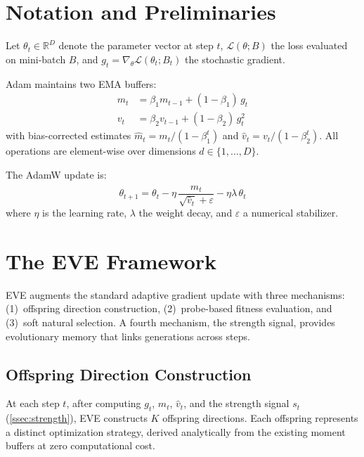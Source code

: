 \documentclass[12pt]{article}
\newcommand{\R}{\mathbb{R}}
\newcommand{\Loss}{\mathcal{L}}
\begin{document}
\section{Notation and Preliminaries}
\label{sec:notation}

Let $\theta_t \in \R^D$ denote the parameter vector at step $t$,
$\Loss(\theta; B)$ the loss evaluated on mini-batch $B$, and
$g_t = \nabla_\theta \Loss(\theta_t; B_t)$ the stochastic gradient.

Adam maintains two EMA buffers:
\begin{align}
  m_t &= \beta_1 m_{t-1} + (1 - \beta_1)\, g_t
  \label{eq:adam_m} \\
  v_t &= \beta_2 v_{t-1} + (1 - \beta_2)\, g_t^2
  \label{eq:adam_v}
\end{align}
with bias-corrected estimates
$\hat{m}_t = m_t / (1 - \beta_1^t)$ and
$\hat{v}_t = v_t / (1 - \beta_2^t)$.
All operations are element-wise over dimensions $d \in \{1, \ldots, D\}$.

The AdamW update is:
\begin{equation}
  \theta_{t+1} = \theta_t
    - \eta\,\frac{\hat{m}_t}{\sqrt{\hat{v}_t} + \varepsilon}
    - \eta\lambda\,\theta_t
  \label{eq:adamw}
\end{equation}
where $\eta$ is the learning rate, $\lambda$ the weight decay, and
$\varepsilon$ a numerical stabilizer.


\section{The EVE Framework}
\label{sec:method}

EVE augments the standard adaptive gradient update with three mechanisms:
(1)~offspring direction construction, (2)~probe-based fitness evaluation,
and (3)~soft natural selection.
A fourth mechanism, the strength signal, provides evolutionary memory
that links generations across steps.

\subsection{Offspring Direction Construction}
\label{ssec:offspring}

At each step $t$, after computing $g_t$, $\hat{m}_t$, $\hat{v}_t$, and
the strength signal $s_t$ (\cref{ssec:strength}), EVE constructs $K$
offspring directions.
Each offspring represents a distinct optimization strategy, derived
analytically from the existing moment buffers at zero computational cost.
\end{document}
